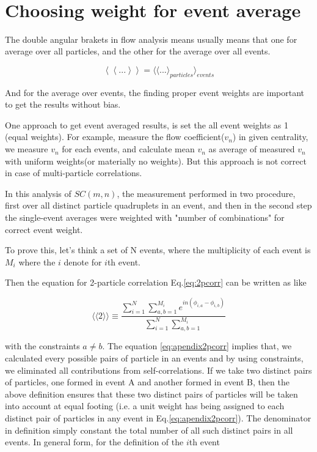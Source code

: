 
\newpage\
\chapter{Choosing weight for event average}

The double angular brakets in flow analysis means usually means that one for average over all particles, and the other for the average over all events.

	$$ \left\langle  \left\langle . . . \right\rangle  \right\rangle = \langle \langle . . .  \rangle _{particles} \rangle _{events} $$

And for the average over events, the finding proper event weights are important to get the results without bias. 

One approach to get event averaged results, is set the all event weights as 1 (equal weights). For example, measure the flow coefficient($v_n$) in given centrality, we measure $v_n$ for each events, and calculate mean $v_n$ as average of measured $v_n$ with uniform weights(or materially no weights). But this approach is not correct in case of multi-particle correlations. 

In this analysis of $SC(m,n)$, the measurement performed in two procedure, first over all distinct particle quadruplets in an event, and then in the second step the single-event averages were weighted with  "number of combinations" for correct event weight.

To prove this, let's think a set of N events, where the multiplicity of each event is $M_{i}$ where the $i$ denote for $i$th event. 

Then the equation for 2-particle correlation Eq.\ref{eq:2pcorr} can be written as like

\begin{equation}
	\langle \langle 2 \rangle \rangle  \equiv 	\frac{\sum_{i=1}^{N} \sum_{a,b=1}^{M_i} e^{in(\phi_{i,a}-\phi_{i,b})} }{\sum_{i=1}^{N} \sum_{a,b=1}^{M_i}}
	\label{eq:apendix2pcorr}
\end{equation}


with the constraints $a \neq b$.  The equation \ref{eq:apendix2pcorr} implies that, we calculated every possible pairs of particle in an events and by using constraints, we eliminated all contributions from self-correlations. If we take two distinct pairs of particles, one formed in event A and another formed in event B, then the above definition ensures that these two distinct pairs of particles will be taken into account at equal footing (i.e. a unit weight has being assigned to each distinct pair of particles in any event in Eq.\ref{eq:apendix2pcorr}). The denominator in definition simply constant the total number of all such distinct pairs in all events. In general form, for the definition of the $i$th event 

